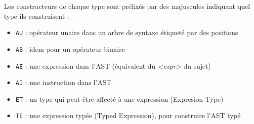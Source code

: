 \documentclass[a4paper]{article}
\begin{document}
Les constructeurs de chaque type sont préfixés par des majuscules indiquant quel type ils construisent :
\begin{itemize}
    \item \texttt{AU} : opérateur unaire dans un arbre de syntaxe étiqueté par des positions
    \item \texttt{AB} : idem pour un opérateur binaire
    \item \texttt{AE} : une expression dans l'AST (équivalent du \emph{<expr>} du sujet)
    \item \texttt{AI} : une instruction dans l'AST
    \item \texttt{ET} : un type qui peut être affecté à une expression (Expresion Type)
    \item \texttt{TE} : une expression typée (Typed Expression), pour construire l'AST typé
\end{itemize}
\end{document}
